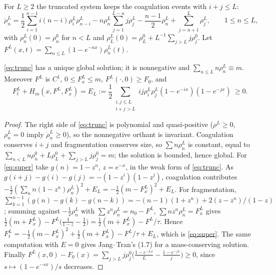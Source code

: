 \documentclass[11pt,a4paper]{report}
\begin{document}
For \(L\ge2\) the truncated system keeps the coagulation events with \(i+j\le L\):
\begin{equation}\label{eq:trunc}
\dot\rho^L_n=\frac12\sum_{i=1}^{n-1}i(n-i)\rho^L_i\rho^L_{n-i}-n\rho^L_n\sum_{j=1}^{L-n}j\rho^L_j
-\frac{n-1}{2}\rho^L_n+\sum_{j=n+1}^{L}\rho^L_j,\qquad1\le n\le L,
\end{equation}
with \(\rho^L_n(0)=\rho^0_n\) for \(n<L\) and \(\rho^L_L(0)=\rho^0_L+L^{-1}\sum_{j>L}j\rho^0_j\). Let
\(F^L(x,t)=\sum_{n\le L}(1-e^{-nx})\rho^L_n(t)\).

\begin{lemma}\label{lem:trunc}
\eqref{eq:trunc} has a unique global solution; it is nonnegative and \(\sum_{n\le L}n\rho^L_n\equiv m\).
Moreover \(F^L\) is \(C^1\), \(0\le F^L_x\le m\), \(F^L(\cdot,0)\ge F_0\), and
\begin{equation}\label{eq:super}
F^L_t+H_m(x,F^L,F^L_x)=E_L:=\frac12\sum_{\substack{i,j\le L\\ i+j>L}}ij\rho^L_i\rho^L_j(1-e^{-ix})(1-e^{-jx})\ \ge0 .
\end{equation}
\end{lemma}
\begin{proof}
The right side of \eqref{eq:trunc} is polynomial and quasi-positive (\(\rho^L\ge0\), \(\rho^L_n=0\) imply
\(\dot\rho^L_n\ge0\)), so the nonnegative orthant is invariant. Coagulation conserves \(i+j\) and fragmentation
conserves size, so \(\sum n\rho^L_n\) is constant, equal to \(\sum_{n<L}n\rho^0_n+L\rho^0_L+\sum_{j>L}j\rho^0_j=m\);
the solution is bounded, hence global. For \eqref{eq:super} take \(g(n)=1-z^n\), \(z=e^{-x}\), in the weak
form of \eqref{eq:trunc}. As \(g(i+j)-g(i)-g(j)=-(1-z^i)(1-z^j)\), coagulation contributes
\(-\frac12(\sum_nn(1-z^n)\rho^L_n)^2+E_L=-\frac12(m-F^L_x)^2+E_L\). For fragmentation,
\(\sum_{k=1}^{n-1}(g(n)-g(k)-g(n-k))=-(n-1)(1+z^n)+2(z-z^n)/(1-z)\); summing against \(-\frac12\rho^L_n\) with
\(\sum z^n\rho^L_n=n_0-F^L\), \(\sum nz^n\rho^L_n=F^L_x\) gives
\(\frac12(m+F^L_x)-F^L\bigl(\frac1{1-z}-\frac12\bigr)=\frac12(m+F^L_x)-F^L/\tau\). Hence
\(F^L_t=-\frac12(m-F^L_x)^2+\frac12(m+F^L_x)-F^L/\tau+E_L\), which is \eqref{eq:super}. The same computation
with \(E=0\) gives Jang--Tran's (1.7) for a mass-conserving solution. Finally
\(F^L(x,0)-F_0(x)=\sum_{j>L}j\rho^0_j\bigl(\frac{1-e^{-Lx}}L-\frac{1-e^{-jx}}j\bigr)\ge0\), since
\(s\mapsto(1-e^{-sx})/s\) decreases.
\end{proof}
\end{document}
